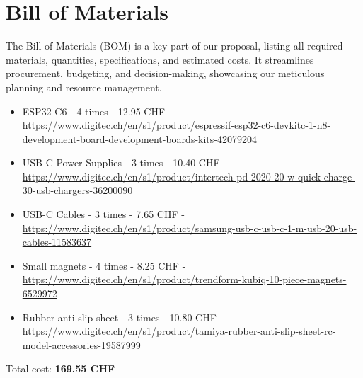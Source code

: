 \section{Bill of Materials}

The Bill of Materials (BOM) is a key part of our proposal, listing all required materials, quantities, specifications, and estimated costs.
It streamlines procurement, budgeting, and decision-making, showcasing our meticulous planning and resource management.

\begin{itemize}
    \item ESP32 C6 - 4 times - 12.95 CHF - \url{https://www.digitec.ch/en/s1/product/espressif-esp32-c6-devkitc-1-n8-development-board-development-boards-kits-42079204}
    \item USB-C Power Supplies - 3 times - 10.40 CHF - \url{https://www.digitec.ch/en/s1/product/intertech-pd-2020-20-w-quick-charge-30-usb-chargers-36200090}
    \item USB-C Cables - 3 times - 7.65 CHF - \url{https://www.digitec.ch/en/s1/product/samsung-usb-c-usb-c-1-m-usb-20-usb-cables-11583637}
    \item Small magnets - 4 times - 8.25 CHF - \url{https://www.digitec.ch/en/s1/product/trendform-kubiq-10-piece-magnets-6529972}
    \item Rubber anti slip sheet - 3 times - 10.80 CHF - \url{https://www.digitec.ch/en/s1/product/tamiya-rubber-anti-slip-sheet-rc-model-accessories-19587999}
\end{itemize}

Total cost: \textbf{169.55 CHF}

